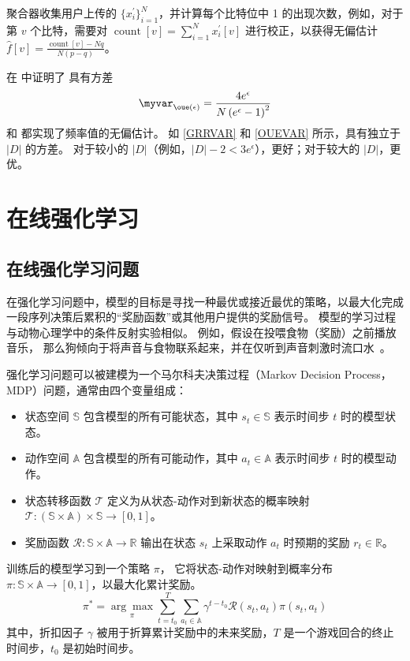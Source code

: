聚合器收集用户上传的 $\{x_i^{\prime}\}_{i=1}^{N}$，并计算每个比特位中 1 的出现次数，例如，对于第 $v$ 个比特，需要对 $\operatorname{count}[v] = \sum_{i = 1}^{N} x_i^{\prime}[v]$ 进行校正，以获得无偏估计 $\hat{f}[v] = \frac{\operatorname{count}[v] - Nq}{N(p - q)}$。

在 \cite{wang2017locally} 中证明了 \oue 具有方差
\begin{equation}
\myvar_{\oue(\epsilon)} = \frac{4e^{\epsilon}}{N\left(e^{\epsilon}-1\right)^{2}}
\label{OUEVAR}
\end{equation}
\grr 和 \oue 都实现了频率值的无偏估计。
如 \autoref{GRRVAR} 和 \autoref{OUEVAR} 所示，\oue 具有独立于 $|D|$ 的方差。
对于较小的 $|D|$（例如，$|D|-2<3e^\epsilon$），\grr 更好；对于较大的 $|D|$，\oue 更优。


\section{在线强化学习}

\subsection{在线强化学习问题}
\label{sec:Reinforcement Learning Problem}
在强化学习问题中，模型的目标是寻找一种最优或接近最优的策略，以最大化完成一段序列决策后累积的“奖励函数”或其他用户提供的奖励信号。
模型的学习过程与动物心理学中的条件反射实验相似。
例如，假设在投喂食物（奖励）之前播放音乐，
那么狗倾向于将声音与食物联系起来，并在仅听到声音刺激时流口水~\cite{PG41}。

强化学习问题可以被建模为一个马尔科夫决策过程（Markov Decision Process，MDP）问题，通常由四个变量组成：
\begin{itemize}
\item 状态空间 $\mathbb{S}$ 包含模型的所有可能状态，其中 $s_t \in \mathbb{S}$ 表示时间步 $t$ 时的模型状态。
\item 动作空间 $\mathbb{A}$ 包含模型的所有可能动作，其中 $a_t \in \mathbb{A}$ 表示时间步 $t$ 时的模型动作。
\item 状态转移函数 $\mathcal{T}$ 定义为从状态-动作对到新状态的概率映射 $\mathcal{T}: (\mathbb{S} \times \mathbb{A}) \times \mathbb{S} \rightarrow [0, 1]$。
\item 奖励函数 $\mathcal{R}: \mathbb{S} \times \mathbb{A} \rightarrow \mathbb{R}$ 输出在状态 $s_t$ 上采取动作 $a_t$ 时预期的奖励 $r_t \in \mathbb{R}$。
\end{itemize}
训练后的模型学习到一个策略 $\pi$，
它将状态-动作对映射到概率分布 $\pi: \mathbb{S} \times \mathbb{A} \rightarrow [0, 1]$，以最大化累计奖励。
\begin{equation}
    \pi^{*}=\underset{\pi}{\arg \max } \sum_{t=t_{0}}^{T} \sum_{a_{t} \in \mathbb{A}} \gamma^{t-t_{0}} \mathcal{R}\left(s_{t}, a_{t}\right) \pi\left(s_{t}, a_{t}\right)
\end{equation}
其中，折扣因子 $\gamma$ 被用于折算累计奖励中的未来奖励，$T$ 是一个游戏回合的终止时间步，$t_0$ 是初始时间步。

